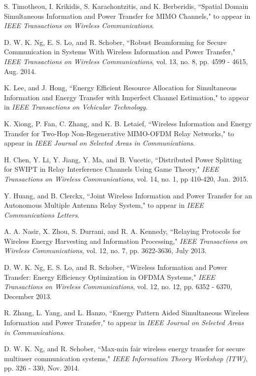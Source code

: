 \documentclass[twocolumn,10pt]{IEEEtran}
\begin{document}
\begin{thebibliography}{99}
S. Timotheou,  I. Krikidis,  S. Karachontzitis, and K. Berberidis,  
``Spatial Domain Simultaneous Information and Power Transfer for MIMO Channels," 
to appear in \emph{IEEE Transactions on Wireless Communications}.  

D. W. K. Ng, E. S. Lo, and R. Schober, 
``Robust Beamforming for Secure Communication in Systems With Wireless Information and Power Transfer,"
\emph{IEEE Transactions on Wireless Communications}, vol. 13, no. 8, pp. 4599 - 4615, Aug. 2014.


K. Lee, and J. Hong, 
``Energy Efficient Resource Allocation for Simultaneous Information and Energy Transfer with Imperfect Channel Estimation,"  to appear in \emph{IEEE Transactions on Vehicular Technology}.

K. Xiong, P. Fan, C. Zhang, and K. B. Letaief, ``Wireless Information and Energy Transfer for Two-Hop Non-Regenerative MIMO-OFDM Relay Networks," to appear in \emph{IEEE Journal on Selected Areas in Communications}.

H. Chen, Y. Li, Y. Jiang, Y. Ma, and B. Vucetic,  
``Distributed Power Splitting for SWIPT in Relay Interference Channels Using Game Theory," 
\emph{IEEE Transactions on Wireless Communications},  vol. 14, no. 1, pp 410-420, Jan. 2015.

Y. Huang, and B. Clerckx, 
``Joint Wireless Information and Power Transfer for an Autonomous Multiple Antenna Relay System," to appear in \emph{IEEE Communications Letters}.  

A. A. Nasir, X. Zhou, S. Durrani, and R. A. Kennedy, ``Relaying Protocols for Wireless Energy Harvesting and Information Processing,"  \emph{IEEE Transactions on Wireless Communications}, vol. 12, no. 7,	pp. 3622-3636,  July  2013.

D. W. K. Ng, E. S. Lo, and R. Schober,
``Wireless Information and Power Transfer: Energy Efficiency Optimization in OFDMA Systems," 
 \emph{IEEE Transactions on Wireless Communications},
 vol. 12, no. 12, pp. 6352 - 6370, December  2013.


R. Zhang, L. Yang, and L. Hanzo,  
``Energy Pattern Aided Simultaneous Wireless Information and Power Transfer," to appear in \emph{IEEE Journal on Selected Areas in Communications}.

D. W. K. Ng, and R. Schober,
``Max-min fair wireless energy transfer for secure multiuser communication systems," \emph{IEEE Information Theory Workshop (ITW)}, pp. 326 - 330, Nov. 2014.


\end{thebibliography}
\end{document}
